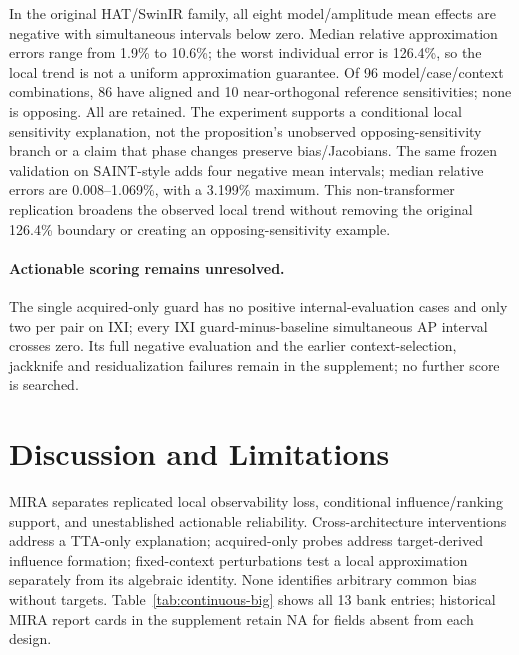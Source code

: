 \documentclass[10pt,twocolumn,letterpaper]{article}
\begin{document}
In the original HAT/SwinIR family, all eight model/amplitude mean effects are negative with simultaneous intervals below zero. Median relative approximation errors range from 1.9\% to 10.6\%; the worst individual error is 126.4\%, so the local trend is not a uniform approximation guarantee. Of 96 model/case/context combinations, 86 have aligned and 10 near-orthogonal reference sensitivities; none is opposing. All are retained. The experiment supports a conditional local sensitivity explanation, not the proposition's unobserved opposing-sensitivity branch or a claim that phase changes preserve bias/Jacobians. The same frozen validation on SAINT-style adds four negative mean intervals; median relative errors are 0.008--1.069\%, with a 3.199\% maximum. This non-transformer replication broadens the observed local trend without removing the original 126.4\% boundary or creating an opposing-sensitivity example.

\paragraph{Actionable scoring remains unresolved.}
The single acquired-only guard has no positive internal-evaluation cases and only two per pair on IXI; every IXI guard-minus-baseline simultaneous AP interval crosses zero. Its full negative evaluation and the earlier context-selection, jackknife and residualization failures remain in the supplement; no further score is searched.



\section{Discussion and Limitations}
MIRA separates replicated local observability loss, conditional influence/ranking support, and unestablished actionable reliability. Cross-architecture interventions address a TTA-only explanation; acquired-only probes address target-derived influence formation; fixed-context perturbations test a local approximation separately from its algebraic identity. None identifies arbitrary common bias without targets. Table~\ref{tab:continuous-big} shows all 13 bank entries; historical MIRA report cards in the supplement retain NA for fields absent from each design.
\end{document}
